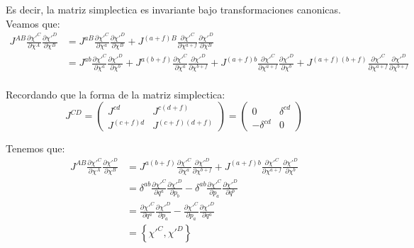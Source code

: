 \documentclass[paper=a4, fontsize=11pt,twoside]{scrartcl}
\begin{document}
Es decir, la matriz simplectica es invariante bajo transformaciones canonicas. \\

Veamos que:
	\begin{align*}
		J^{AB}\frac{\partial \chi'^{C}}{\partial \chi^{A}}\frac{\partial \chi'^{D}}{\partial \chi^{B}} 
	 &= J^{aB}\frac{\partial \chi'^{C}}{\partial \chi^{a}}\frac{\partial \chi'^{D}}{\partial \chi^{B}} 
	   +J^{\left(a+f\right)B}\frac{\partial \chi'^{C}}{\partial \chi^{a+f}}\frac{\partial \chi'^{D}}{\partial \chi^{B}} \\
	 &= J^{ab}\frac{\partial \chi'^{C}}{\partial \chi^{a}}\frac{\partial \chi'^{D}}{\partial \chi^{b}} 
	   +J^{a\left(b+f\right)}\frac{\partial \chi'^{C}}{\partial \chi^{a}}\frac{\partial \chi'^{D}}{\partial \chi^{b+f}} 
	   +J^{\left(a+f\right)b}\frac{\partial \chi'^{C}}{\partial \chi^{a+f}}\frac{\partial \chi'^{D}}{\partial \chi^{b}} 
	   +J^{\left(a+f\right)\left(b+f\right)}\frac{\partial \chi'^{C}}{\partial \chi^{a+f}}\frac{\partial \chi'^{D}}{\partial \chi^{b+f}} \\
	\end{align*}
	
Recordando que la forma de la matriz simplectica:
	\begin{equation*}
		J^{CD} = \begin{pmatrix} J^{cd} & J^{c\left(d+f\right)} \\
								 J^{\left(c+f\right) d} & J^{\left(c+f\right) \left(d+f\right)} \end{pmatrix}
		= \begin{pmatrix} 0 & \delta^{cd} \\
								 -\delta^{cd} & 0 \end{pmatrix}
	\end{equation*}

Tenemos que:
	\begin{align*}
		J^{AB}\frac{\partial \chi'^{C}}{\partial \chi^{A}}\frac{\partial \chi'^{D}}{\partial \chi^{B}} 
	 &= J^{a\left(b+f\right)}\frac{\partial \chi'^{C}}{\partial \chi^{a}}\frac{\partial \chi'^{D}}{\partial \chi^{b+f}} 
	   +J^{\left(a+f\right)b}\frac{\partial \chi'^{C}}{\partial \chi^{a+f}}\frac{\partial \chi'^{D}}{\partial \chi^{b}} \\
	 &= \delta^{ab}\frac{\partial \chi'^{C}}{\partial q^{a}}\frac{\partial \chi'^{D}}{\partial p_{b}}
	   -\delta^{ab}\frac{\partial \chi'^{C}}{\partial p_{a}}\frac{\partial \chi'^{D}}{\partial q^{b}} \\
	 &= \frac{\partial \chi'^{C}}{\partial q^{a}}\frac{\partial \chi'^{D}}{\partial p_{a}}
	   -\frac{\partial \chi'^{C}}{\partial p_{a}}\frac{\partial \chi'^{D}}{\partial q^{a}} \\	   
	 &= \left\{ \chi'^{C}, \chi'^{D}  \right\}	 
	\end{align*}	 
\end{document}
